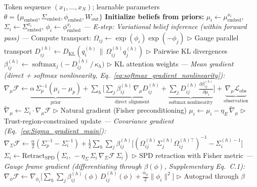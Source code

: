 \documentclass[twoside,11pt]{article}
\newcommand{\softmax}{\operatorname{softmax}}
\newcommand{\KL}{\operatorname{KL}}
\begin{document}
\begin{algorithm}[t]
\caption{GL($K$) Gauge Transformer Training Loop}
\label{alg:em_loop}
\begin{algorithmic}[1]
\REQUIRE Token sequence $(x_1, \ldots, x_N)$; learnable parameters $\theta = \{\mu_{\text{embed}}, \Sigma_{\text{embed}}, \phi_{\text{embed}}, W_{\text{out}}\}$
\STATE \textbf{Initialize beliefs from priors:} $\mu_i \leftarrow \mu_{\text{embed}}^{x_i}$, $\Sigma_i \leftarrow \Sigma_{\text{embed}}^{x_i}$, $\phi_i \leftarrow \phi_{\text{embed}}^{x_i}$
\STATE
\STATE \textit{--- E-step: Variational belief inference (within forward pass) ---}
    \STATE Compute transport: $\Omega_{ij} \leftarrow \exp(\phi_i)\exp(-\phi_j)$ \hfill $\triangleright$ Gauge parallel transport
        \STATE $D_{ij}^{(h)} \leftarrow D_{\KL}(q_i^{(h)} \,\|\, \Omega_{ij}^{(h)} q_j^{(h)})$ \hfill $\triangleright$ Pairwise KL divergences
        \STATE $\beta_{ij}^{(h)} \leftarrow \softmax_j\!\Big(-D_{ij}^{(h)} \,/\, \kappa_h\Big)$ \hfill $\triangleright$ KL attention weights
    \ENDFOR
    \STATE \textit{--- Mean gradient (direct + softmax nonlinearity, Eq.~\ref{eq:softmax_gradient_nonlinearity}):}
    \STATE $\nabla_{\mu} \mathcal{F} \leftarrow \underbrace{\alpha\,\Sigma_p^{-1}(\mu_i - \mu_p)}_{\text{prior}}
      + \sum_h \Big[\underbrace{\sum_j \beta_{ij}^{(h)}\, \nabla_\mu D_{ij}^{(h)}}_{\text{direct alignment}}
      + \underbrace{\sum_j D_{ij}^{(h)} \, \frac{\partial \beta_{ij}^{(h)}}{\partial \mu_i}}_{\text{softmax nonlinearity}}\Big]
      + \underbrace{\nabla_\mu \mathcal{L}_{\text{obs}}}_{\text{observation}}$
    \STATE $\tilde{\nabla}_\mu \leftarrow \Sigma_i \cdot \nabla_\mu \mathcal{F}$ \hfill $\triangleright$ Natural gradient (Fisher preconditioning)
    \STATE $\mu_i \leftarrow \mu_i - \eta_E\, \tilde{\nabla}_\mu$ \hfill $\triangleright$ Trust-region-constrained update
    \STATE \textit{--- Covariance gradient (Eq.~\ref{eq:Sigma_gradient_main}):}
    \STATE $\nabla_{\Sigma} \mathcal{F} \leftarrow \tfrac{\alpha}{2}(\Sigma_p^{-1} - \Sigma_i^{-1})
      + \tfrac{1}{2}\sum_h \sum_j \beta_{ij}^{(h)} \big[(\Omega_{ij}^{(h)}\Sigma_j^{(h)}\Omega_{ij}^{(h)\top})^{-1} - \Sigma_i^{(h)-1}\big]$
    \STATE $\Sigma_i \leftarrow \mathrm{Retract}_{\mathrm{SPD}}(\Sigma_i,\, -\eta_\Sigma\, \Sigma_i\,\nabla_\Sigma\mathcal{F}\,\Sigma_i)$ \hfill $\triangleright$ SPD retraction with Fisher metric
    \STATE \textit{--- Gauge frame gradient (differentiating through $\beta(\phi)$, Supplementary Eq.~C.1):}
    \STATE $\nabla_{\phi} \mathcal{F} \leftarrow \nabla_{\phi_i}\!\Big[\sum_h \sum_j \beta_{ij}^{(h)}(\phi)\, D_{ij}^{(h)}(\phi) + \tfrac{\alpha_\phi}{2}\|\phi_i\|^2\Big]$ \hfill $\triangleright$ Autograd through $\beta$

\end{algorithmic}
\end{algorithm}
\end{document}
